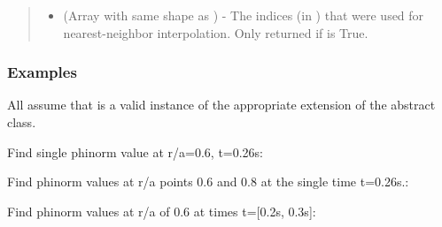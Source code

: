 \documentclass[letterpaper,10pt,english]{sphinxmanual}
\begin{document}
\begin{fulllineitems}
\begin{fulllineitems}
\begin{quote}
\begin{description}
\begin{itemize}
\item {} 
 (Array with same shape as ) - The indices
(in ) that were used for
nearest-neighbor interpolation. Only returned if  is
True.

\end{itemize}


\end{description}\end{quote}
\subsubsection*{Examples}

All assume that  is a valid instance of the appropriate
extension of the {\hyperref[\detokenize{eqtools:eqtools.core.Equilibrium}]{}} abstract class.

Find single phinorm value at r/a=0.6, t=0.26s:

\begin{sphinxVerbatim}[commandchars=\\\{\}]
   
\end{sphinxVerbatim}

Find phinorm values at r/a points 0.6 and 0.8 at the
single time t=0.26s.:

\begin{sphinxVerbatim}[commandchars=\\\{\}]
  \PYG{p}{[} \PYG{p}{]} 
\end{sphinxVerbatim}

Find phinorm values at r/a of 0.6 at times t={[}0.2s, 0.3s{]}:

\begin{sphinxVerbatim}[commandchars=\\\{\}]
   \PYG{p}{[} \PYG{p}{]}
\end{sphinxVerbatim}


\end{fulllineitems}
\end{fulllineitems}
\end{document}

